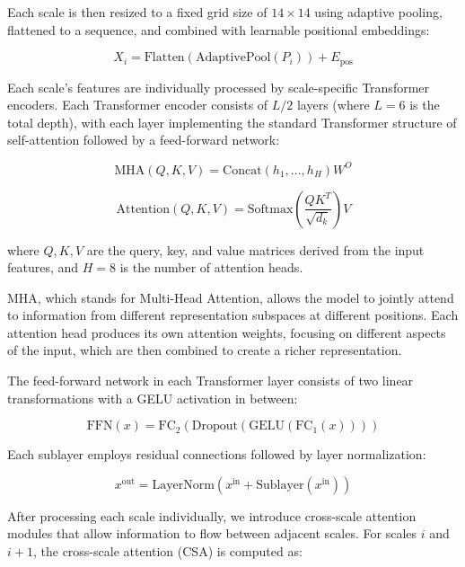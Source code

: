 \documentclass[10pt,twocolumn,letterpaper]{article}
\begin{document}
Each scale is then resized to a fixed grid size of $14 \times 14$ using adaptive pooling, flattened to a sequence, and combined with learnable positional embeddings:

\begin{equation}
X_i = \text{Flatten}(\text{AdaptivePool}(P_i)) + E_{\text{pos}}
\end{equation}

Each scale's features are individually processed by scale-specific Transformer encoders. Each Transformer encoder consists of $L/2$ layers (where $L=6$ is the total depth), with each layer implementing the standard Transformer structure of self-attention followed by a feed-forward network:

\begin{equation}
\text{MHA}(Q, K, V) = \text{Concat}(h_1, \ldots, h_H)W^O
\end{equation}

\begin{equation}
\text{Attention}(Q, K, V) = \text{Softmax}\left(\frac{QK^T}{\sqrt{d_k}}\right)V
\end{equation}

where $Q, K, V$ are the query, key, and value matrices derived from the input features, and $H=8$ is the number of attention heads.

MHA, which stands for Multi-Head Attention, allows the model to jointly attend to information from different representation subspaces at different positions. Each attention head produces its own attention weights, focusing on different aspects of the input, which are then combined to create a richer representation.

The feed-forward network in each Transformer layer consists of two linear transformations with a GELU activation in between:

\begin{equation}
\text{FFN}(x) = \text{FC}_2(\text{Dropout}(\text{GELU}(\text{FC}_1(x))))
\end{equation}

Each sublayer employs residual connections followed by layer normalization:

\begin{equation}
x^{\text{out}} = \text{LayerNorm}(x^{\text{in}} + \text{Sublayer}(x^{\text{in}}))
\end{equation}

After processing each scale individually, we introduce cross-scale attention modules that allow information to flow between adjacent scales. For scales $i$ and $i+1$, the cross-scale attention (CSA) is computed as:
\end{document}
